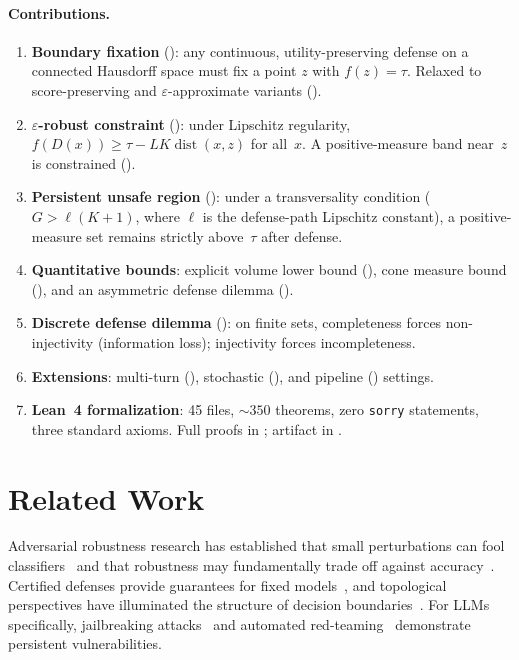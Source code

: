 \documentclass{article}
\newcommand{\dist}{\operatorname{dist}}
\begin{document}
\paragraph{Contributions.}
\begin{enumerate}[nosep]
  \item \textbf{Boundary fixation} (): any continuous,
    utility-preserving defense on a connected Hausdorff space must fix
    a point $z$ with $f(z) = \tau$. Relaxed to score-preserving and
    $\varepsilon$-approximate variants
    ().
  \item \textbf{$\varepsilon$-robust constraint} ():
    under Lipschitz regularity, $f(D(x)) \geq \tau - LK\dist(x,z)$
    for all~$x$. A positive-measure band near~$z$ is constrained
    ().
  \item \textbf{Persistent unsafe region} ():
    under a transversality condition ($G > \ell(K+1)$, where $\ell$ is
    the defense-path Lipschitz constant), a positive-measure set
    remains strictly above~$\tau$ after defense.
  \item \textbf{Quantitative bounds}: explicit volume lower bound
    (), cone measure bound (), and
    an asymmetric defense dilemma ().
  \item \textbf{Discrete defense dilemma} ():
    on finite sets, completeness forces non-injectivity (information
    loss); injectivity forces incompleteness.
  \item \textbf{Extensions}: multi-turn (),
    stochastic (), and pipeline
    () settings.
  \item \textbf{Lean~4 formalization}: 45 files, ${\sim}350$ theorems,
    zero \texttt{sorry} statements, three standard axioms. Full proofs
    in ; artifact in .
\end{enumerate}


\section{Related Work}
\label{sec:related}

Adversarial robustness research has established that small
perturbations can fool classifiers~\cite{szegedy2013intriguing,
goodfellow2014explaining,carlini2017evaluating,madry2018towards} and
that robustness may fundamentally trade off against
accuracy~\cite{tsipras2018robustness,fawzi2018adversarial}. Certified
defenses provide guarantees for fixed
models~\cite{cohen2019certified,katz2017reluplex,singh2019abstract,
huang2017safety,bagnall2019certifying}, and topological perspectives
have illuminated the structure of decision
boundaries~\cite{naitzat2020topology}. For LLMs specifically,
jailbreaking attacks~\cite{zou2023universal,chao2024jailbreaking,
mehrotra2024tree,greshake2023indirect} and automated
red-teaming~\cite{mouret2015illuminating,samvelyan2024rainbow}
demonstrate persistent vulnerabilities.
\end{document}
